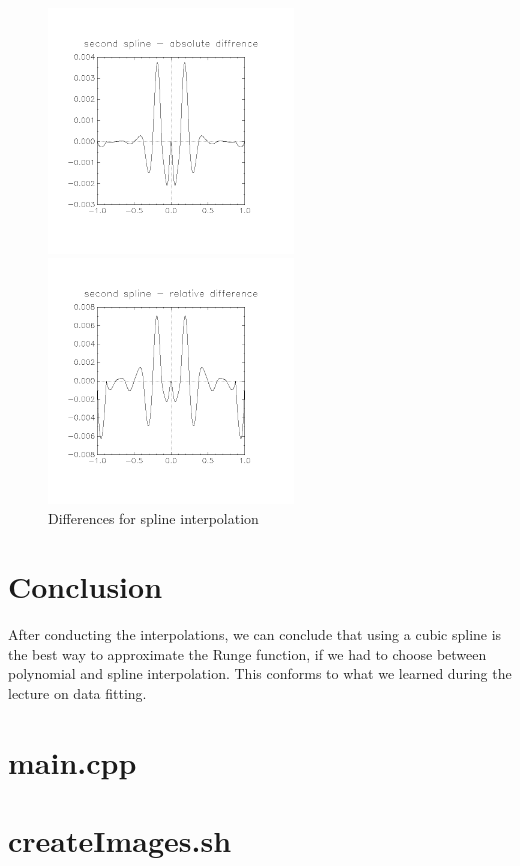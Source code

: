\documentclass[11pt, a4paper, titlepage, openright]{article}
\begin{document}
    \begin{figure}[H]
        \begin{minipage}[b]{0.49\textwidth}
            \includegraphics[width=6.5cm, trim={2cm, 4cm, 2cm, 3cm}, clip]{../images/diff4abs}
        \end{minipage}
        \hfill
        \begin{minipage}[b]{0.49\textwidth}
            \includegraphics[width=6.5cm, trim={2cm, 4cm, 2cm, 3cm}, clip]{../images/diff4rel}
        \end{minipage}
        \caption{Differences for spline interpolation}
        \label{fig:diff4}
    \end{figure}


\section{Conclusion}
    After conducting the interpolations, we can conclude that using a cubic spline is the best way to
    approximate the Runge function, if we had to choose between polynomial and spline interpolation.
    This conforms to what we learned during the lecture on data fitting.

\onecolumn
\appendix
\appendixpage
\addappheadtotoc

\section{main.cpp}
    
    \newpage

\section{createImages.sh}
    
\end{document}
